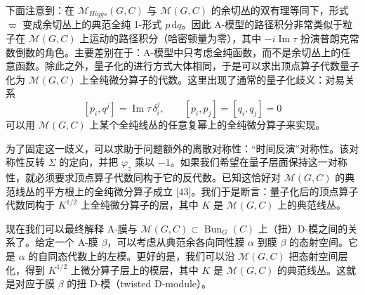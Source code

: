 \documentclass[11pt,a4paper,UTF8]{ctexart}
\begin{document}
下面注意到：在 $\mathcal{M}_{Higgs}(G,C)$ 与 $\mathcal{M}(G,C)$ 的余切丛的双有理等同下，形式 $\varpi$ 变成余切丛上的典范全纯 1-形式 $p\,\mathrm{d}q$。因此 A-模型的路径积分非常类似于粒子在 $\mathcal{M}(G,C)$ 上运动的路径积分（哈密顿量为零），其中 $-i\operatorname{Im}\tau$ 扮演普朗克常数倒数的角色。主要差别在于：A-模型中只考虑全纯函数，而不是余切丛上的任意函数。除此之外，量子化的进行方式大体相同，于是可以求出顶点算子代数量子化为 $\mathcal{M}(G,C)$ 上全纯微分算子的代数。这里出现了通常的量子化歧义：对易关系
\[
    [p_{i},q^{j}]=\operatorname{Im}\tau\,\delta_{i}^{j},\qquad [p_{i},p_{j}]=[q_{i},q_{j}]=0
\]
可以用 $\mathcal{M}(G,C)$ 上某个全纯线丛的任意复幂上的全纯微分算子来实现。



为了固定这一歧义，可以求助于问题额外的离散对称性：“时间反演”对称性。该对称性反转 $\Sigma$ 的定向，并把 $\varphi_{z}$ 乘以 $-1$。如果我们希望在量子层面保持这一对称性，就必须要求顶点算子代数同构于它的反代数。已知这恰好对 $\mathcal{M}(G,C)$ 的典范线丛的平方根上的全纯微分算子成立 [43]。我们于是断言：量子化后的顶点算子代数同构于 $K^{1/2}$ 上全纯微分算子的层，其中 $K$ 是 $\mathcal{M}(G,C)$ 上的典范线丛。


现在我们可以最终解释 A-膜与 $\mathcal{M}(G,C)\subset\operatorname{Bun}_{G}(C)$ 上（扭）D-模之间的关系了。给定一个 A-膜 $\beta$，可以考虑从典范余各向同性膜 $\alpha$ 到膜 $\beta$ 的态射空间。它是 $\alpha$ 的自同态代数上的左模。更好的是，我们可以沿 $\mathcal{M}(G,C)$ 把态射空间层化，得到 $K^{1/2}$ 上微分算子层上的模层，其中 $K$ 是 $\mathcal{M}(G,C)$ 的典范线丛。这就是对应于膜 $\beta$ 的扭 D-模（twisted D-module）。

\end{document}
